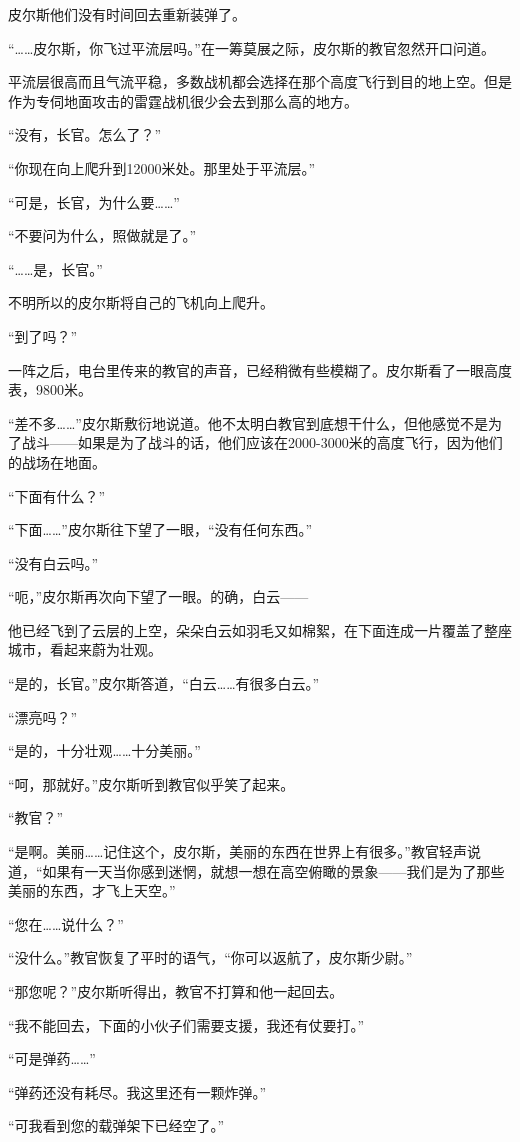 皮尔斯他们没有时间回去重新装弹了。

“……皮尔斯，你飞过平流层吗。”在一筹莫展之际，皮尔斯的教官忽然开口问道。

平流层很高而且气流平稳，多数战机都会选择在那个高度飞行到目的地上空。但是作为专伺地面攻击的雷霆战机很少会去到那么高的地方。

“没有，长官。怎么了？”

“你现在向上爬升到12000米处。那里处于平流层。”

“可是，长官，为什么要……”

“不要问为什么，照做就是了。”

“……是，长官。”

不明所以的皮尔斯将自己的飞机向上爬升。

“到了吗？”

一阵之后，电台里传来的教官的声音，已经稍微有些模糊了。皮尔斯看了一眼高度表，9800米。

“差不多……”皮尔斯敷衍地说道。他不太明白教官到底想干什么，但他感觉不是为了战斗——如果是为了战斗的话，他们应该在2000-3000米的高度飞行，因为他们的战场在地面。

“下面有什么？”

“下面……”皮尔斯往下望了一眼，“没有任何东西。”

“没有白云吗。”

“呃，”皮尔斯再次向下望了一眼。的确，白云——

他已经飞到了云层的上空，朵朵白云如羽毛又如棉絮，在下面连成一片覆盖了整座城市，看起来蔚为壮观。

“是的，长官。”皮尔斯答道，“白云……有很多白云。”

“漂亮吗？”

“是的，十分壮观……十分美丽。”

“呵，那就好。”皮尔斯听到教官似乎笑了起来。

“教官？”

“是啊。美丽……记住这个，皮尔斯，美丽的东西在世界上有很多。”教官轻声说道，“如果有一天当你感到迷惘，就想一想在高空俯瞰的景象——我们是为了那些美丽的东西，才飞上天空。”

“您在……说什么？”

“没什么。”教官恢复了平时的语气，“你可以返航了，皮尔斯少尉。”

“那您呢？”皮尔斯听得出，教官不打算和他一起回去。

“我不能回去，下面的小伙子们需要支援，我还有仗要打。”

“可是弹药……”

“弹药还没有耗尽。我这里还有一颗炸弹。”

“可我看到您的载弹架下已经空了。”


